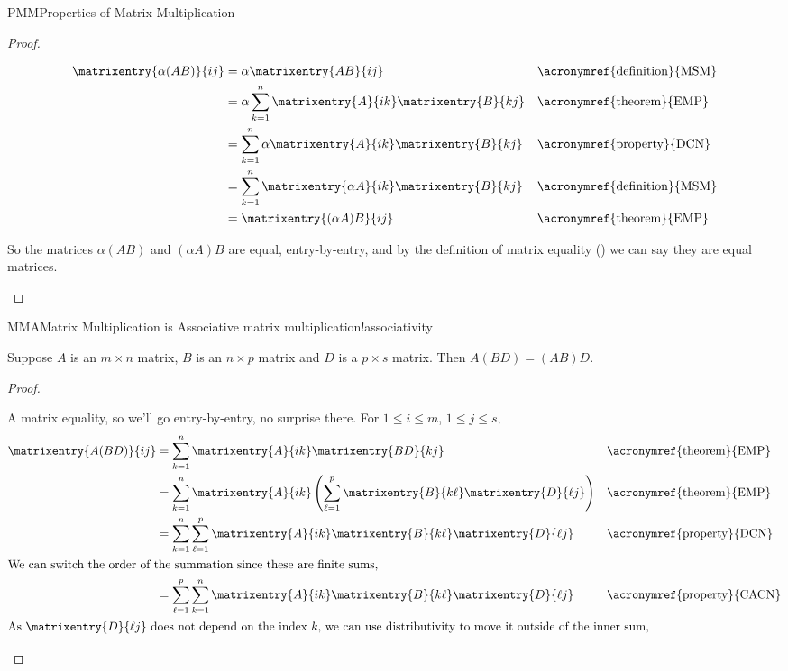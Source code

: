 \begin{subsect}{PMM}{Properties of Matrix Multiplication}
\begin{proof}
\begin{para}
%
\begin{align*}
\matrixentry{\alpha(AB)}{ij}
&=\alpha\matrixentry{AB}{ij}&&\text{\acronymref{definition}{MSM}}\\
&=\alpha\sum_{k=1}^{n}\matrixentry{A}{ik}\matrixentry{B}{kj}&&\text{\acronymref{theorem}{EMP}}\\
&=\sum_{k=1}^{n}\alpha\matrixentry{A}{ik}\matrixentry{B}{kj}&&\text{\acronymref{property}{DCN}}\\
&=\sum_{k=1}^{n}\matrixentry{\alpha A}{ik}\matrixentry{B}{kj}&&\text{\acronymref{definition}{MSM}}\\
&=\matrixentry{(\alpha A)B}{ij}&&\text{\acronymref{theorem}{EMP}}
\end{align*}\end{para}
%
\begin{para}So the matrices $\alpha(AB)$ and $(\alpha A)B$ are equal, entry-by-entry, and by the definition of matrix equality () we can say they are equal matrices.\end{para}
%
\end{proof}
%
\begin{theorem}{MMA}{Matrix Multiplication is Associative }{matrix multiplication!associativity}
\begin{para}Suppose $A$ is an $m\times n$ matrix, $B$ is an $n\times p$ matrix and $D$ is a $p\times s$ matrix.  Then  $A(BD)=(AB)D$.\end{para}
\end{theorem}
%
\begin{proof}
\begin{para}A matrix equality, so we'll go entry-by-entry, no surprise there.    For $1\leq i\leq m$, $1\leq j\leq s$,
%
\begin{align*}
\matrixentry{A(BD)}{ij}
&=\sum_{k=1}^{n}\matrixentry{A}{ik}\matrixentry{BD}{kj}
&&\text{\acronymref{theorem}{EMP}}\\
&=\sum_{k=1}^{n}\matrixentry{A}{ik}\left(\sum_{\ell=1}^{p}\matrixentry{B}{k\ell}\matrixentry{D}{\ell j}\right)
&&\text{\acronymref{theorem}{EMP}}\\
&=\sum_{k=1}^{n}\sum_{\ell=1}^{p}\matrixentry{A}{ik}\matrixentry{B}{k\ell}\matrixentry{D}{\ell j}
&&\text{\acronymref{property}{DCN}}\\
%
\intertext{We can switch the order of the summation since these are finite sums,}
%
&=\sum_{\ell=1}^{p}\sum_{k=1}^{n}\matrixentry{A}{ik}\matrixentry{B}{k\ell}\matrixentry{D}{\ell j}
&&\text{\acronymref{property}{CACN}}\\
%
\intertext{As $\matrixentry{D}{\ell j}$ does not depend on the index $k$, we can use distributivity to move it outside of the inner sum,}

\end{align*}
\end{para}
\end{proof}
\end{subsect}
